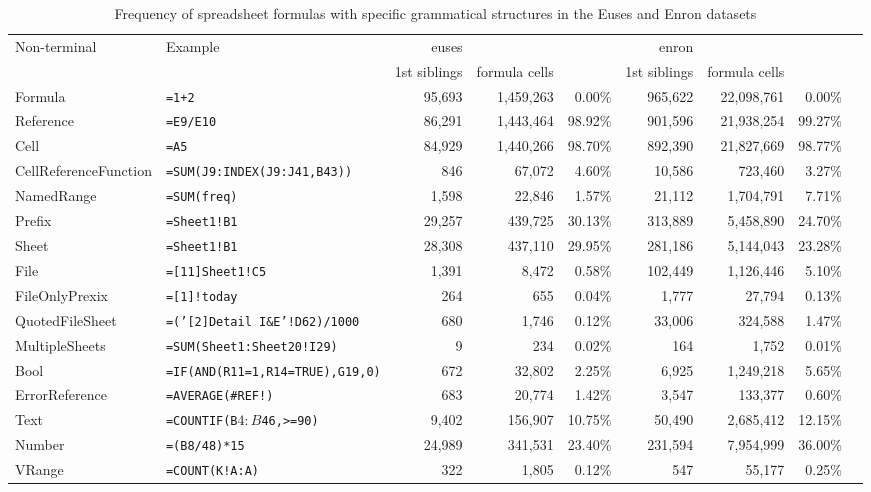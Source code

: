 \documentclass[conference]{IEEEtran}
\begin{document}
\begin{table*}
	\label{table:occurences}
	\caption{Frequency of spreadsheet formulas with specific grammatical structures in the Euses and Enron datasets}
	\begin{tabular}{llrrrrrrr}
		Non-terminal & Example & euses &  &  & enron &  & \\
		&  & 1st siblings& formula cells &  & 1st siblings& formula cells & \\
		\hline
		Formula & \texttt{=1+2} & 95,693 & 1,459,263 & 0.00\% & 965,622 & 22,098,761 & 0.00\%\\
		Reference & \texttt{=E9/E10} & 86,291 & 1,443,464 & 98.92\% & 901,596 & 21,938,254 & 99.27\%\\
		Cell & \texttt{=A5} & 84,929 & 1,440,266 & 98.70\% & 892,390 & 21,827,669 & 98.77\%\\
		CellReferenceFunction & \texttt{=SUM(J9:INDEX(J9:J41,B43))} & 846 & 67,072 & 4.60\% & 10,586 & 723,460 & 3.27\%\\
		NamedRange & \texttt{=SUM(freq)} & 1,598 & 22,846 & 1.57\% & 21,112 & 1,704,791 & 7.71\%\\
		Prefix & \texttt{=Sheet1!B1} & 29,257 & 439,725 & 30.13\% & 313,889 & 5,458,890 & 24.70\%\\
		Sheet & \texttt{=Sheet1!B1} & 28,308 & 437,110 & 29.95\% & 281,186 & 5,144,043 & 23.28\%\\
		File & \texttt{=[11]Sheet1!C5} & 1,391 & 8,472 & 0.58\% & 102,449 & 1,126,446 & 5.10\%\\
		FileOnlyPrexix & \texttt{=[1]!today} & 264 & 655 & 0.04\% & 1,777 & 27,794 & 0.13\%\\
		QuotedFileSheet & \texttt{=('[2]Detail I\&E'!D62)/1000} & 680 & 1,746 & 0.12\% & 33,006 & 324,588 & 1.47\%\\
		MultipleSheets & \texttt{=SUM(Sheet1:Sheet20!I29)} & 9 & 234 & 0.02\% & 164 & 1,752 & 0.01\%\\
		Bool & \texttt{=IF(AND(R11=1,R14=TRUE),G19,0)} & 672 & 32,802 & 2.25\% & 6,925 & 1,249,218 & 5.65\%\\
		ErrorReference & \texttt{=AVERAGE(\#REF!)} & 683 & 20,774 & 1.42\% & 3,547 & 133,377 & 0.60\%\\
		Text & \texttt{=COUNTIF(B$4:B$46,>=90)} & 9,402 & 156,907 & 10.75\% & 50,490 & 2,685,412 & 12.15\%\\
		Number & \texttt{=(B8/48)*15} & 24,989 & 341,531 & 23.40\% & 231,594 & 7,954,999 & 36.00\%\\
		VRange & \texttt{=COUNT(K!A:A)} & 322 & 1,805 & 0.12\% & 547 & 55,177 & 0.25\%\\

\end{tabular}
\end{table*}
\end{document}
